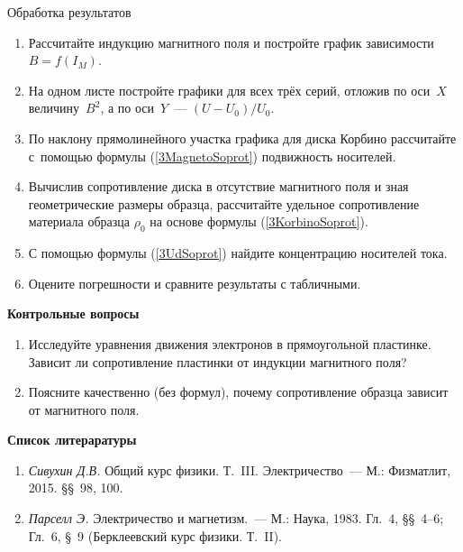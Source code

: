 {\rm Обработка результатов}
\begin{enumerate}





\item { Рассчитайте индукцию магнитного поля и постройте график зависимости~$B=f(I_{M})$.}

\item { На одном листе постройте графики для всех трёх серий, отложив по оси~$X$ величину~$B^2$, а по оси~$Y$~--- $(U-U_0)/U_0$.}

\item { По наклону прямолинейного участка графика для диска Корбино рассчитайте с~помощью формулы (\ref{3MagnetoSoprot}) подвижность носителей.}

\item { Вычислив сопротивление диска в отсутствие магнитного поля и зная геометрические размеры образца, рассчитайте удельное сопротивление материала образца $\rho_0$ на основе формулы (\ref{3KorbinoSoprot}).}

\item {С помощью формулы (\ref{3UdSoprot}) найдите концентрацию носителей тока.}

\item { Оцените погрешности и сравните результаты с табличными.}
\end{enumerate}

{

\small

{\bf \Large Контрольные вопросы}
\begin{enumerate}


\item{ Исследуйте уравнения движения электронов в прямоугольной пластинке. Зависит ли сопротивление пластинки от индукции магнитного поля?}

\item{ Поясните качественно (без формул), почему сопротивление образца зависит от магнитного поля.}
\end{enumerate}

{\bf \Large Список литераратуры}

\begin{enumerate}

\item{ \emph{Сивухин Д.В.} Общий курс физики. Т.~III. Электричество~--- М.: Физматлит, 2015. \S\S~98, 100.}

\item{ \emph{Парселл Э.} Электричество и магнетизм.~--- М.: Наука, 1983. Гл.~4, \S\S~4--6; Гл.~6, \S~9 (Берклеевский курс физики. Т.~II).}

\end{enumerate}
}

